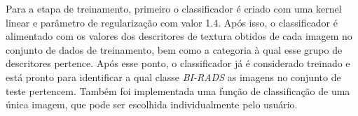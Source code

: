 Para a etapa de treinamento, primeiro o classificador é criado com uma kernel linear e 
parâmetro de regularização com valor 1.4. Após isso, o classificador é alimentado com 
os valores dos descritores de textura obtidos de cada imagem no conjunto de dados de 
treinamento, bem como a categoria à qual esse grupo de descritores pertence. Após esse ponto, 
o classificador já é considerado treinado e está pronto para identificar a qual classe \emph{BI-RADS}
as imagens no conjunto de teste pertencem. Também foi implementada uma função de classificação 
de uma única imagem, que pode ser escolhida individualmente pelo usuário. 